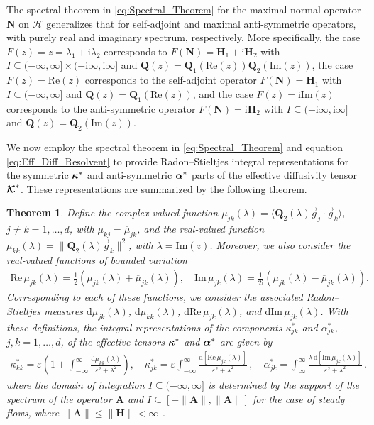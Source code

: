 \documentclass[11pt]{amsart}
\newcommand{\I}{\mathrm{i}}
\renewcommand{\d}{\mathrm{d}}
\newcommand{\Hb}{\mathbf{H}}
\newcommand{\Ab}{\mathbf{A}}
\newcommand{\Qb}{\mathbf{Q}}
\newcommand{\Nb}{\mathbf{N}}
\newcommand\Kbc{\mbox{\boldmath${\mathcal{K}}$}}
\newcommand{\Hs}{\mathscr{H}}
\newcommand\balpha{\mbox{\boldmath${\alpha}$}}
\newcommand\bkappa{\mbox{\boldmath${\kappa}$}}
\newtheorem{theorem}{Theorem}[section]
\begin{document}
The spectral theorem in \eqref{eq:Spectral_Theorem} for the maximal
normal operator $\Nb$ on $\Hs$ 
generalizes that for self-adjoint and maximal anti-symmetric
operators, with purely real and imaginary spectrum, respectively. More
specifically, the case $F(z)=z=\lambda_1+\I\lambda_2$ corresponds to
$F(\Nb)=\Hb_1+\I\Hb_2$ with $I\subseteq(-\infty,\infty]\times(-\I\infty,\I\infty]$ and
$\Qb(z)=\Qb_1(\text{Re}(z))\Qb_2(\text{Im}(z))$, the case
$F(z)=\text{Re}(z)$ corresponds to the self-adjoint operator
$F(\Nb)=\Hb_1$ with $I\subseteq(-\infty,\infty]$ and $\Qb(z)=\Qb_1(\text{Re}(z))$, and
the case $F(z)=\I\text{Im}(z)$ corresponds to the anti-symmetric
operator $F(\Nb)=\I\Hb_2$ with $I\subseteq(-\I\infty,\I\infty]$ and
$\Qb(z)=\Qb_2(\text{Im}(z))$. 



We now employ the spectral theorem in \eqref{eq:Spectral_Theorem} and
equation \eqref{eq:Eff_Diff_Resolvent} to provide Radon--Stieltjes
integral representations for the symmetric $\bkappa^*$ and
anti-symmetric $\balpha^*$ parts of the effective diffusivity tensor
$\Kbc^*$. These representations are summarized by the following
theorem.
%
\begin{theorem}
Define 
the  
complex-valued function
$\mu_{jk}(\lambda)=\langle\Qb_2(\lambda)\vec{g}_j\cdot\vec{g}_k\rangle$, $j\neq k=1,\ldots,d$, with
$\mu_{kj}=\overline{\mu}_{jk}$, and the real-valued 
function $\mu_{kk}(\lambda)=\|\Qb_2(\lambda)\vec{g}_k\|^2$, with
$\lambda=\text{Im}(z)$.  Moreover, we also consider the real-valued
functions of bounded variation
%
\begin{align}
  \text{Re}\,\mu_{jk}(\lambda)=\frac{1}{2}(\mu_{jk}(\lambda)+\overline{\mu}_{jk}(\lambda)), \quad
  \text{Im}\,\mu_{jk}(\lambda)=\frac{1}{2\I}(\mu_{jk}(\lambda)-\overline{\mu}_{jk}(\lambda)).
\end{align}
%
Corresponding to each of these functions, we consider the associated
Radon--Stieltjes measures $\d\mu_{jk}(\lambda)$, $\d\mu_{kk}(\lambda)$,
$\d\text{Re}\,\mu_{jk}(\lambda)$, and $\d\text{Im}\,\mu_{jk}(\lambda)$. With these
definitions, the integral representations of the components $\kappa^*_{jk}$
and $\alpha^*_{jk}$, $j,k=1,\ldots,d$, of the effective tensors $\bkappa^*$ and
$\balpha^*$ are given by 
%
\begin{align}\label{eq:Integral_Rep_kappa*}
  \kappa^*_{kk}=\varepsilon\left(1+\int_{-\infty}^\infty\frac{\d\mu_{kk}(\lambda)}{\varepsilon^2+\lambda^2}\right),
  \quad
  \kappa^*_{jk}=\varepsilon\int_{-\infty}^\infty\frac{\d[\text{Re}\,\mu_{jk}(\lambda)]}{\varepsilon^2+\lambda^2}\,,
  \quad
  \alpha^*_{jk}=\int_{\infty}^\infty\frac{\lambda\,\d[\text{Im}\,\overline{\mu}_{jk}(\lambda)]}{\varepsilon^2+\lambda^2}\,.       
\end{align}
%
where the domain of integration $I\subseteq(-\infty,\infty]$ is determined by the
support of the spectrum of the operator $\Ab$ and $I\subseteq[-\|\Ab\|,\|\Ab\|]$
for the case of steady flows, where $\|\Ab\|\leq\|\Hb\|<\infty$ \cite{Reed-1980}.
%
\end{theorem}
\end{document}
